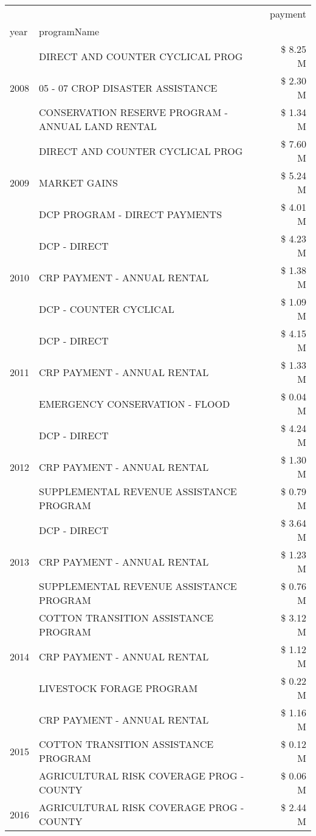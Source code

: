 \begin{tabular}{llr}
\toprule
 &  & payment \\
year & programName &  \\
\midrule
\multirow[t]{3}{*}{2008} & DIRECT AND COUNTER CYCLICAL PROG & \$ 8.25 M \\
 & 05 - 07 CROP DISASTER ASSISTANCE & \$ 2.30 M \\
 & CONSERVATION RESERVE PROGRAM - ANNUAL LAND RENTAL & \$ 1.34 M \\
\cline{1-3}
\multirow[t]{3}{*}{2009} & DIRECT AND COUNTER CYCLICAL PROG & \$ 7.60 M \\
 & MARKET GAINS & \$ 5.24 M \\
 & DCP PROGRAM - DIRECT PAYMENTS & \$ 4.01 M \\
\cline{1-3}
\multirow[t]{3}{*}{2010} & DCP - DIRECT & \$ 4.23 M \\
 & CRP PAYMENT - ANNUAL RENTAL & \$ 1.38 M \\
 & DCP - COUNTER CYCLICAL & \$ 1.09 M \\
\cline{1-3}
\multirow[t]{3}{*}{2011} & DCP - DIRECT & \$ 4.15 M \\
 & CRP PAYMENT - ANNUAL RENTAL & \$ 1.33 M \\
 & EMERGENCY CONSERVATION - FLOOD & \$ 0.04 M \\
\cline{1-3}
\multirow[t]{3}{*}{2012} & DCP - DIRECT & \$ 4.24 M \\
 & CRP PAYMENT - ANNUAL RENTAL & \$ 1.30 M \\
 & SUPPLEMENTAL REVENUE ASSISTANCE PROGRAM & \$ 0.79 M \\
\cline{1-3}
\multirow[t]{3}{*}{2013} & DCP - DIRECT & \$ 3.64 M \\
 & CRP PAYMENT - ANNUAL RENTAL & \$ 1.23 M \\
 & SUPPLEMENTAL REVENUE ASSISTANCE PROGRAM & \$ 0.76 M \\
\cline{1-3}
\multirow[t]{3}{*}{2014} & COTTON TRANSITION ASSISTANCE PROGRAM & \$ 3.12 M \\
 & CRP PAYMENT - ANNUAL RENTAL & \$ 1.12 M \\
 & LIVESTOCK FORAGE PROGRAM & \$ 0.22 M \\
\cline{1-3}
\multirow[t]{3}{*}{2015} & CRP PAYMENT - ANNUAL RENTAL & \$ 1.16 M \\
 & COTTON TRANSITION ASSISTANCE PROGRAM & \$ 0.12 M \\
 & AGRICULTURAL RISK COVERAGE PROG - COUNTY & \$ 0.06 M \\
\cline{1-3}
\multirow[t]{3}{*}{2016} & AGRICULTURAL RISK COVERAGE PROG - COUNTY & \$ 2.44 M \\

\end{tabular}
